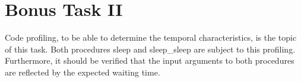 	\section{Bonus Task II} %
	\label{sec:bonus_task_2}
		Code profiling, to be able to determine the temporal characteristics, is the topic of this task. Both procedures sleep and sleep\_sleep are subject to this profiling. Furthermore, it should be verified that the input arguments to both procedures are reflected by the expected waiting time.

